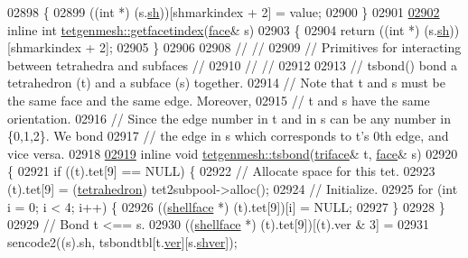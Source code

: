 \begin{DoxyCode}
02898 \{
02899   ((\textcolor{keywordtype}{int} *) (s.\hyperlink{classtetgenmesh_1_1face_a0ebac53728a624fcb6528a7d2571b987}{sh}))[shmarkindex + 2] = value;
02900 \}
02901 
\hypertarget{tetgen_8h_source.tex_l02902}{}\hyperlink{classtetgenmesh_ab4b3f98e52ac862ab3c619708c5bc07d}{02902} \textcolor{keyword}{inline} \textcolor{keywordtype}{int} \hyperlink{classtetgenmesh_ab4b3f98e52ac862ab3c619708c5bc07d}{tetgenmesh::getfacetindex}(\hyperlink{classtetgenmesh_1_1face}{face}& s)
02903 \{
02904   \textcolor{keywordflow}{return} ((\textcolor{keywordtype}{int} *) (s.\hyperlink{classtetgenmesh_1_1face_a0ebac53728a624fcb6528a7d2571b987}{sh}))[shmarkindex + 2];
02905 \}
02906 
02908 \textcolor{comment}{//                                                                           //}
02909 \textcolor{comment}{// Primitives for interacting between tetrahedra and subfaces                //}
02910 \textcolor{comment}{//                                                                           //}
02912 \textcolor{comment}{}
02913 \textcolor{comment}{// tsbond() bond a tetrahedron (t) and a subface (s) together.}
02914 \textcolor{comment}{// Note that t and s must be the same face and the same edge. Moreover,}
02915 \textcolor{comment}{//   t and s have the same orientation. }
02916 \textcolor{comment}{// Since the edge number in t and in s can be any number in \{0,1,2\}. We bond}
02917 \textcolor{comment}{//   the edge in s which corresponds to t's 0th edge, and vice versa.}
02918 
\hypertarget{tetgen_8h_source.tex_l02919}{}\hyperlink{classtetgenmesh_aae16d3c2903a72e7f956d886499c2910}{02919} \textcolor{keyword}{inline} \textcolor{keywordtype}{void} \hyperlink{classtetgenmesh_aae16d3c2903a72e7f956d886499c2910}{tetgenmesh::tsbond}(\hyperlink{classtetgenmesh_1_1triface}{triface}& t, \hyperlink{classtetgenmesh_1_1face}{face}& s)
02920 \{
02921   \textcolor{keywordflow}{if} ((t).tet[9] == NULL) \{
02922     \textcolor{comment}{// Allocate space for this tet.}
02923     (t).tet[9] = (\hyperlink{classtetgenmesh_a6a12b1c0d1834ca941d16c62e949e5e3}{tetrahedron}) tet2subpool->alloc();
02924     \textcolor{comment}{// Initialize.}
02925     \textcolor{keywordflow}{for} (\textcolor{keywordtype}{int} i = 0; i < 4; i++) \{
02926       ((\hyperlink{classtetgenmesh_ad4860123b88783b943fa6452e886a2cb}{shellface} *) (t).tet[9])[i] = NULL;
02927     \}
02928   \}
02929   \textcolor{comment}{// Bond t <== s.}
02930   ((\hyperlink{classtetgenmesh_ad4860123b88783b943fa6452e886a2cb}{shellface} *) (t).tet[9])[(t).ver & 3] = 
02931     sencode2((s).sh, tsbondtbl[t.\hyperlink{classtetgenmesh_1_1triface_a2b2b1dc34da73125359d6db535d75f7c}{ver}][s.\hyperlink{classtetgenmesh_1_1face_a990a58ccf240d0d4197c2a923a1853d6}{shver}]);

\end{DoxyCode}
